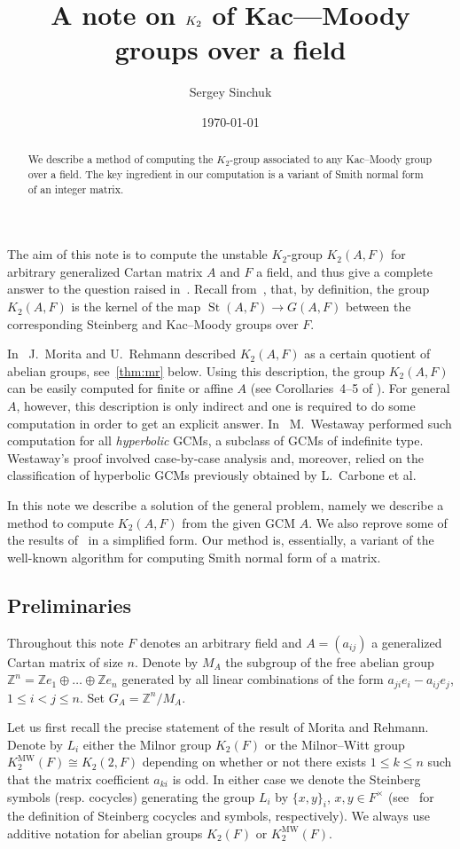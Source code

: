 \documentclass[oneside, 10pt]{amsart}
\title{A note on $\K$ of Kac---Moody groups over a field}
\author {Sergey Sinchuk}
\date {\today}
\theoremstyle{plain}
\theoremstyle{remark}
\theoremstyle{definition}
\DeclareMathOperator{\St}{St}
\newcommand{\ZZ}{\mathbb{Z}}
\newcommand{\K}{K_2}
\newcommand{\Kmw}{K^{\mathrm{MW}}_2}
\begin{document}
   
\begin{abstract} We describe a method of computing the $\K$-group associated to any Kac--Moody group over a field.
 The key ingredient in our computation is a variant of Smith normal form of an integer matrix.
\end{abstract}


\maketitle
The aim of this note is to compute the unstable $\K$-group $\K(A, F)$ for arbitrary generalized Cartan matrix $A$ and $F$ a field,
 and thus give a complete answer to the question raised in~\cite{MW}.
Recall from~\cite{MR}, \cite{Ti} that, by definition, the group $\K(A, F)$ is the kernel of the map 
 $\St(A, F) \to G(A, F)$ between the corresponding Steinberg and Kac--Moody groups over $F$.

In~\cite{MR} J.~Morita and U.~Rehmann described $\K(A, F)$ as a certain quotient of abelian groups, see~\cref{thm:mr} below.
Using this description, the group $\K(A, F)$ can be easily computed for finite or affine $A$ (see Corollaries~4--5 of \cite{MR}).
For general $A$, however, this description is only indirect and one is required to do some computation in order to get an explicit answer.
In~\cite{MW} M.~Westaway performed such computation for all {\it hyperbolic} GCMs, a subclass of GCMs of indefinite type. 
Westaway's proof involved case-by-case analysis and, moreover, 
 relied on the classification of hyperbolic GCMs previously obtained by L.~Carbone et al.

In this note we describe a solution of the general problem, namely we describe a method to compute $\K(A, F)$ from the given GCM $A$.
We also reprove some of the results of~\cite{MW} in a simplified form.
Our method is, essentially, a variant of the well-known algorithm for computing Smith normal form of a matrix.

\subsection{Preliminaries}
Throughout this note $F$ denotes an arbitrary field and $A=(a_{ij})$ a generalized Cartan matrix of size $n$.
Denote by $M_A$ the subgroup of the free abelian group $\ZZ^n = \ZZ e_1 \oplus \ldots \oplus \ZZ e_n $ generated by all 
 linear combinations of the form $a_{ji} e_i - a_{ij} e_j$, $1\leq i<j\leq n$.
Set $G_A = \ZZ^n/M_A$.

Let us first recall the precise statement of the result of Morita and Rehmann.
Denote by $L_i$ either the Milnor group $\K(F)$ or the Milnor--Witt group $\Kmw(F)\cong K_2(2, F)$ 
 depending on whether or not there exists $1 \leq k \leq n$ such that the matrix coefficient $a_{ki}$ is odd.
In either case we denote the Steinberg symbols (resp. cocycles) generating the group $L_i$ by $\{x,y\}_i$, $x, y\in F^\times$
 (see~\cite[Proposition~5.5, Lemme~5.6]{Ma} for the definition of Steinberg cocycles and symbols, respectively).
We always use additive notation for abelian groups $\K(F)$ or $\Kmw(F)$.
 
\end{document}
